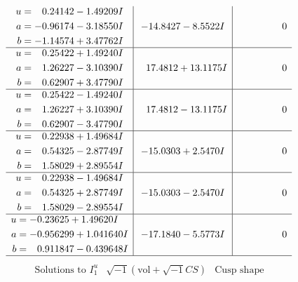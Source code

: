 \documentclass[1p]{elsarticle_modified}
\theoremstyle{definition}
\newcommand{\I}{\sqrt{-1}}
\begin{document}
$$\begin{array}{c|c|c}
\begin{aligned}
u &= \phantom{-}0.24142 - 1.49209 I \\
a &= -0.96174 - 3.18550 I \\
b &= -1.14574 + 3.47762 I\end{aligned}
 & -14.8427 - 8.5522 I & \phantom{-0.000000 } 0 \\ \hline\begin{aligned}
u &= \phantom{-}0.25422 + 1.49240 I \\
a &= \phantom{-}1.26227 - 3.10390 I \\
b &= \phantom{-}0.62907 + 3.47790 I\end{aligned}
 & \phantom{-}17.4812 + 13.1175 I & \phantom{-0.000000 } 0 \\ \hline\begin{aligned}
u &= \phantom{-}0.25422 - 1.49240 I \\
a &= \phantom{-}1.26227 + 3.10390 I \\
b &= \phantom{-}0.62907 - 3.47790 I\end{aligned}
 & \phantom{-}17.4812 - 13.1175 I & \phantom{-0.000000 } 0 \\ \hline\begin{aligned}
u &= \phantom{-}0.22938 + 1.49684 I \\
a &= \phantom{-}0.54325 - 2.87749 I \\
b &= \phantom{-}1.58029 + 2.89554 I\end{aligned}
 & -15.0303 + 2.5470 I & \phantom{-0.000000 } 0 \\ \hline\begin{aligned}
u &= \phantom{-}0.22938 - 1.49684 I \\
a &= \phantom{-}0.54325 + 2.87749 I \\
b &= \phantom{-}1.58029 - 2.89554 I\end{aligned}
 & -15.0303 - 2.5470 I & \phantom{-0.000000 } 0 \\ \hline\begin{aligned}
u &= -0.23625 + 1.49620 I \\
a &= -0.956299 + 1.041640 I \\
b &= \phantom{-}0.911847 - 0.439648 I\end{aligned}
 & -17.1840 - 5.5773 I & \phantom{-0.000000 } 0\\
 \hline 
 \end{array}$$\newpage$$\begin{array}{c|c|c}  
\text{Solutions to }I^u_{1}& \I (\text{vol} + \sqrt{-1}CS) & \text{Cusp shape}\\
 \hline 
\begin{aligned}

\end{aligned}
\end{array}$$
\end{document}

